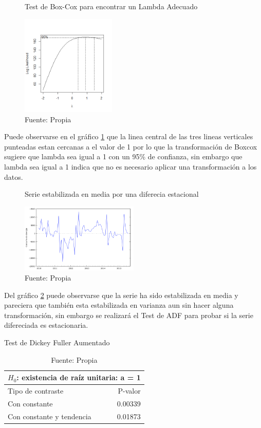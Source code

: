 \documentclass[12pt,letterpaper]{report}
\begin{document}
\begin{figure}[htb]

\centering
\caption{Test de Box-Cox para encontrar un Lambda Adecuado} 
\includegraphics [width=0.4\textwidth]{BoxcoxPlot}
\caption*{Fuente: Propia} \label{Graf3}

\end{figure}
\newpage
Puede observarse en el gráfico \ref{Graf3} que la linea central de las tres lineas verticales punteadas estan cercanas a el valor de 1 por lo que la transformación de Boxcox sugiere que lambda sea igual a 1 con un 95\% de confianza, sin embargo que lambda sea igual a 1 indica que no es necesario aplicar una transformación a los datos.

\begin{figure}[htb]

\centering
\caption{Serie estabilizada en media por una diferecia estacional} 
\includegraphics [width=0.5\textwidth]{SerieDIFF}
\caption*{Fuente: Propia} \label{Graf4}

\end{figure}

Del gráfico \ref{Graf4} puede observarse que la serie ha sido estabilizada en media y pareciera que también esta estabilizada en varianza aun sin hacer alguna transformación, sin embargo se realizará el Test de ADF para probar si la serie difereciada es estacionaria.

\begin{table}[ht]
\caption{Test de Dickey Fuller Aumentado} \label{Test2}
\centering
\begin{tabular}{lr}
\hline
  \hline
 \multicolumn{2}{|c|}{$H_0$: existencia de raíz unitaria: a = 1 }\\
 \hline
Tipo de contraste & P-valor\\ 
 \hline
Con constante & 0.00339\\
 \hline
Con constante y tendencia & 0.01873\\

\hline
   \hline
\end{tabular}
\caption*{Fuente: Propia}
\end{table}
\end{document}
